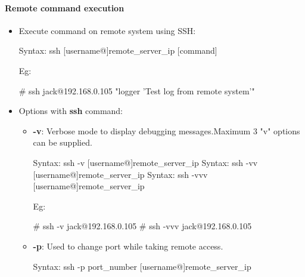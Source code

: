\begin{flushleft}
\begin{itemize}
\begin{itemize}
	\end{itemize}
	
	\end{itemize}
	
	
	
\paragraph{Remote command execution}
	
	\begin{itemize}
	\item Execute command on remote system using SSH:
		\begin{tcolorbox}[breakable,notitle,boxrule=0pt,colback=pink,colframe=pink]
		\color{black}
		\font=9pt
		Syntax: ssh [username@]remote\_server\_ip [command]
		\font=4pt
	\end{tcolorbox}
	
	Eg:
	\begin{tcolorbox}[breakable,notitle,boxrule=-0pt,colback=black,colframe=black]
		\color{green}
		\font=9pt
		\# ssh jack@192.168.0.105 "logger 'Test log from remote system'"
		\font=4pt
	\end{tcolorbox}
	\bigskip
	\bigskip
	
	\item Options with \textbf{ssh} command:
	\newline
	\begin{itemize}
		\item \textbf{-v}: Verbose mode to display debugging messages.Maximum 3 "v" options can be supplied.
		\begin{tcolorbox}[breakable,notitle,boxrule=0pt,colback=pink,colframe=pink]
			\color{black}
			\font=9pt
			Syntax: ssh -v [username@]remote\_server\_ip
			\newline
			Syntax: ssh -vv [username@]remote\_server\_ip
			\newline
			Syntax: ssh -vvv [username@]remote\_server\_ip
			\font=4pt
		\end{tcolorbox}
		
		Eg:
		\begin{tcolorbox}[breakable,notitle,boxrule=-0pt,colback=black,colframe=black]
			\color{green}
			\font=9pt
			\# ssh -v jack@192.168.0.105
			\newline
			\# ssh -vvv jack@192.168.0.105
			\font=4pt
		\end{tcolorbox}
		\bigskip
		\bigskip
		\item \textbf{-p}: Used to change port while taking remote access.
		\begin{tcolorbox}[breakable,notitle,boxrule=0pt,colback=pink,colframe=pink]
			\color{black}
			\font=9pt
			Syntax: ssh -p port\_number [username@]remote\_server\_ip
			\font=4pt
		\end{tcolorbox}
		

\end{itemize}
\end{itemize}
\end{flushleft}
